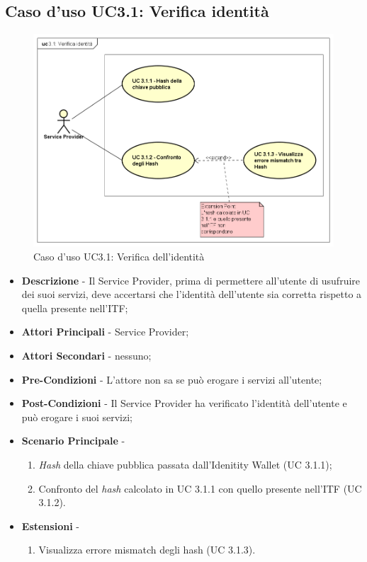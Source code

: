 \subsection{Caso d'uso UC3.1: Verifica identità}
\begin{figure}[h]
	\centering
	\includegraphics[scale=0.50]{immagini/usecase/UC31_VerificaIdentita}
	\caption{Caso d'uso UC3.1: Verifica dell'identità}
\end{figure}
\begin{itemize}
	\item \textbf{Descrizione} -  Il Service Provider, prima di permettere all'utente di usufruire dei suoi servizi, deve accertarsi che l'identità dell'utente sia corretta rispetto a quella presente nell'\gls{ITF};
	\item \textbf{Attori Principali} - Service Provider;
	\item \textbf{Attori Secondari} - nessuno;
	\item \textbf{Pre-Condizioni} - L'attore non sa se può erogare i servizi all'utente;
	\item \textbf{Post-Condizioni} - Il Service Provider ha verificato l'identità dell'utente e può erogare i suoi servizi;
	\item \textbf{Scenario Principale} -
	\begin{enumerate}
		\item \textit{Hash} della chiave pubblica passata dall'Idenitity Wallet (UC 3.1.1);
		\item Confronto del \textit{hash} calcolato in UC 3.1.1 con quello presente nell'\gls{ITF} (UC 3.1.2).
	\end{enumerate}
	\item \textbf{Estensioni} -
	\begin{enumerate}
		\item Visualizza errore mismatch degli hash (UC 3.1.3).
	\end{enumerate}
\end{itemize}
